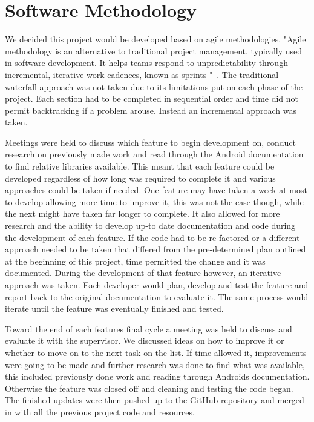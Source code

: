\pagebreak
\section{Software Methodology}
We decided this project would be developed based on agile methodologies. "Agile methodology is an alternative to traditional project management, typically used in software development. It helps teams respond to unpredictability through incremental, iterative work cadences, known as sprints "~\cite{agile}. The traditional waterfall approach was not taken due to its limitations put on each phase of the project. Each section had to be completed in sequential order and time did not permit backtracking if a problem arouse. Instead an incremental approach was taken. 

Meetings were held to discuss which feature to begin development on, conduct research on previously made work and read through the Android documentation to find relative libraries available. This meant that each feature could be developed regardless of how long was required to complete it and various approaches could be taken if needed. One feature may have taken a week at most to develop allowing more time to improve it, this was not the case though, while the next might have taken far longer to complete. It also allowed for more research and the ability to develop up-to date documentation and code during the development of each feature. If the code had to be re-factored or a different approach needed to be taken that differed from the pre-determined plan outlined at the beginning of this project, time permitted the change and it was documented. During the development of that feature however, an iterative approach was taken. Each developer would plan, develop and test the feature and report back to the original documentation to evaluate it. The same process would iterate until the feature was eventually finished and tested.

Toward the end of each features final cycle a meeting was held to discuss and evaluate it with the supervisor. We discussed ideas on how to improve it or whether to move on to the next task on the list. If time allowed it, improvements were going to be made and further research was done to find what was available, this included previously done work and reading through Androids documentation. Otherwise the feature was closed off and cleaning and testing the code began. The finished updates were then pushed up to the GitHub repository and merged in with all the previous project code and resources.

